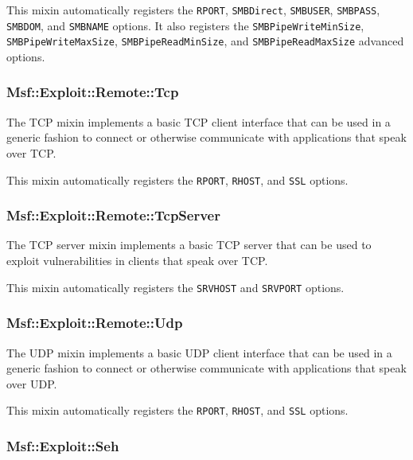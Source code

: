 \documentclass{report}
\begin{document}
\par
This mixin automatically registers the \texttt{RPORT},
\texttt{SMBDirect}, \texttt{SMBUSER}, \texttt{SMBPASS},
\texttt{SMBDOM}, and \texttt{SMBNAME} options.  It also registers
the \texttt{SMBPipeWriteMinSize}, \texttt{SMBPipeWriteMaxSize},
\texttt{SMBPipeReadMinSize}, and \texttt{SMBPipeReadMaxSize}
advanced options.

            \subsubsection{Msf::Exploit::Remote::Tcp}

\par
The TCP mixin implements a basic TCP client interface that can be
used in a generic fashion to connect or otherwise communicate with
applications that speak over TCP.

\par
This mixin automatically registers the \texttt{RPORT},
\texttt{RHOST}, and \texttt{SSL} options.

            \subsubsection{Msf::Exploit::Remote::TcpServer}

\par
The TCP server mixin implements a basic TCP server that can be used
to exploit vulnerabilities in clients that speak over TCP.

\par
This mixin automatically registers the \texttt{SRVHOST} and
\texttt{SRVPORT} options.

            \subsubsection{Msf::Exploit::Remote::Udp}

\par
The UDP mixin implements a basic UDP client interface that can be
used in a generic fashion to connect or otherwise communicate with
applications that speak over UDP.

\par
This mixin automatically registers the \texttt{RPORT},
\texttt{RHOST}, and \texttt{SSL} options.

            \subsubsection{Msf::Exploit::Seh}
\end{document}
